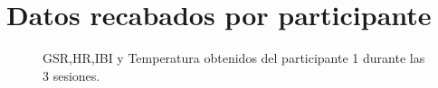 \appendix{}
\section{Datos recabados por participante}
\begin{figure}[h]
        \centering
        \caption{GSR,HR,IBI y Temperatura obtenidos del participante 1 durante las 3 sesiones.}\label{fig:data_p1}
\end{figure}
\pagebreak

